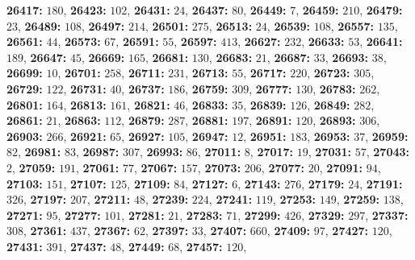 \textsf{\bfseries 26417:} $180$, \textsf{\bfseries 26423:} $102$, \textsf{\bfseries 26431:} $24$, \textsf{\bfseries 26437:} $80$, \textsf{\bfseries 26449:} $7$, \textsf{\bfseries 26459:} $210$, \textsf{\bfseries 26479:} $23$, \textsf{\bfseries 26489:} $108$, \textsf{\bfseries 26497:} $214$, \textsf{\bfseries 26501:} $275$, \textsf{\bfseries 26513:} $24$, \textsf{\bfseries 26539:} $108$, \textsf{\bfseries 26557:} $135$, \textsf{\bfseries 26561:} $44$, \textsf{\bfseries 26573:} $67$, \textsf{\bfseries 26591:} $55$, \textsf{\bfseries 26597:} $413$, \textsf{\bfseries 26627:} $232$, \textsf{\bfseries 26633:} $53$, \textsf{\bfseries 26641:} $189$, \textsf{\bfseries 26647:} $45$, \textsf{\bfseries 26669:} $165$, \textsf{\bfseries 26681:} $130$, \textsf{\bfseries 26683:} $21$, \textsf{\bfseries 26687:} $33$, \textsf{\bfseries 26693:} $38$, \textsf{\bfseries 26699:} $10$, \textsf{\bfseries 26701:} $258$, \textsf{\bfseries 26711:} $231$, \textsf{\bfseries 26713:} $55$, \textsf{\bfseries 26717:} $220$, \textsf{\bfseries 26723:} $305$, \textsf{\bfseries 26729:} $122$, \textsf{\bfseries 26731:} $40$, \textsf{\bfseries 26737:} $186$, \textsf{\bfseries 26759:} $309$, \textsf{\bfseries 26777:} $130$, \textsf{\bfseries 26783:} $262$, \textsf{\bfseries 26801:} $164$, \textsf{\bfseries 26813:} $161$, \textsf{\bfseries 26821:} $46$, \textsf{\bfseries 26833:} $35$, \textsf{\bfseries 26839:} $126$, \textsf{\bfseries 26849:} $282$, \textsf{\bfseries 26861:} $21$, \textsf{\bfseries 26863:} $112$, \textsf{\bfseries 26879:} $287$, \textsf{\bfseries 26881:} $197$, \textsf{\bfseries 26891:} $120$, \textsf{\bfseries 26893:} $306$, \textsf{\bfseries 26903:} $266$, \textsf{\bfseries 26921:} $65$, \textsf{\bfseries 26927:} $105$, \textsf{\bfseries 26947:} $12$, \textsf{\bfseries 26951:} $183$, \textsf{\bfseries 26953:} $37$, \textsf{\bfseries 26959:} $82$, \textsf{\bfseries 26981:} $83$, \textsf{\bfseries 26987:} $307$, \textsf{\bfseries 26993:} $86$, \textsf{\bfseries 27011:} $8$, \textsf{\bfseries 27017:} $19$, \textsf{\bfseries 27031:} $57$, \textsf{\bfseries 27043:} $2$, \textsf{\bfseries 27059:} $191$, \textsf{\bfseries 27061:} $77$, \textsf{\bfseries 27067:} $157$, \textsf{\bfseries 27073:} $206$, \textsf{\bfseries 27077:} $20$, \textsf{\bfseries 27091:} $94$, \textsf{\bfseries 27103:} $151$, \textsf{\bfseries 27107:} $125$, \textsf{\bfseries 27109:} $84$, \textsf{\bfseries 27127:} $6$, \textsf{\bfseries 27143:} $276$, \textsf{\bfseries 27179:} $24$, \textsf{\bfseries 27191:} $326$, \textsf{\bfseries 27197:} $207$, \textsf{\bfseries 27211:} $48$, \textsf{\bfseries 27239:} $224$, \textsf{\bfseries 27241:} $119$, \textsf{\bfseries 27253:} $149$, \textsf{\bfseries 27259:} $138$, \textsf{\bfseries 27271:} $95$, \textsf{\bfseries 27277:} $101$, \textsf{\bfseries 27281:} $21$, \textsf{\bfseries 27283:} $71$, \textsf{\bfseries 27299:} $426$, \textsf{\bfseries 27329:} $297$, \textsf{\bfseries 27337:} $308$, \textsf{\bfseries 27361:} $437$, \textsf{\bfseries 27367:} $62$, \textsf{\bfseries 27397:} $33$, \textsf{\bfseries 27407:} $660$, \textsf{\bfseries 27409:} $97$, \textsf{\bfseries 27427:} $120$, \textsf{\bfseries 27431:} $391$, \textsf{\bfseries 27437:} $48$, \textsf{\bfseries 27449:} $68$, \textsf{\bfseries 27457:} $120$, 
